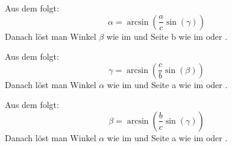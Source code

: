 \documentclass[ngerman,12pt]{scrartcl}
\begin{document}
\begin{fall}[a,c,$\gamma$]
Aus dem  folgt:
$$
\alpha = \arcsin \left( \frac{a}{c} \sin(\gamma) \right)
$$
Danach löst man Winkel $\beta$ wie im  und Seite b wie im  oder .
\end{fall}

\begin{fall}[b,c,$\beta$]
Aus dem  folgt:
$$
\gamma = \arcsin \left( \frac{c}{b} \sin(\beta) \right)
$$
Danach löst man Winkel $\alpha$ wie im  und Seite a wie im  oder .
\end{fall}

\begin{fall}[b,c,$\gamma$]
Aus dem  folgt:
$$
\beta = \arcsin \left( \frac{b}{c} \sin(\gamma) \right)
$$
Danach löst man Winkel $\alpha$ wie im  und Seite a wie im  oder .
\end{fall}
\end{document}
